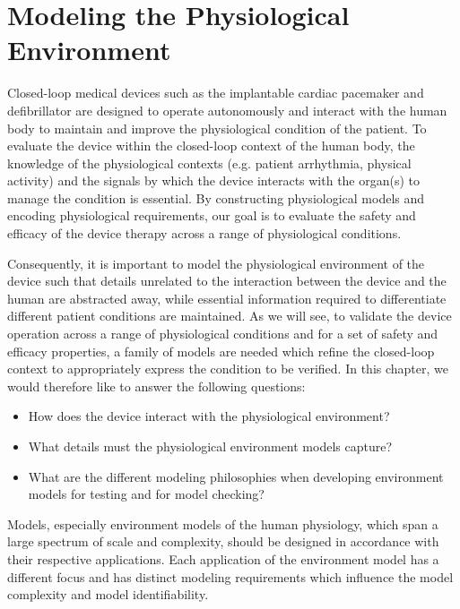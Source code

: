 \chapter{Modeling the Physiological Environment}

Closed-loop medical devices such as the implantable cardiac pacemaker and defibrillator are designed to operate autonomously and interact with the human body to maintain and improve the physiological condition of the patient. To evaluate the device within the closed-loop context of the human body, the knowledge of the physiological contexts (e.g. patient arrhythmia, physical activity) and the signals by which the device interacts with the organ(s) to manage the condition is essential. By constructing physiological models and encoding physiological requirements, our goal is to evaluate the safety and efficacy of the device therapy across a range of physiological conditions. 

Consequently, it is important to model the physiological environment of the device such that details unrelated to the interaction between the device and the human are abstracted away, while essential information required to differentiate different patient conditions are maintained. As we will see, to validate the device operation across a range of physiological conditions and for a set of safety and efficacy properties, a family of models are needed which refine the closed-loop context to appropriately express the condition to be verified. In this chapter, we would therefore like to answer the following questions:
\newpage
\begin{itemize}
\vspace{-5pt}
\item How does the device interact with the physiological environment?
\vspace{-5pt}
\item What details must the physiological environment models capture?
\vspace{-5pt}
\item What are the different modeling philosophies when developing environment models for testing and for model checking?
\end{itemize}

Models, especially environment models of the human physiology, which span a large spectrum of scale and complexity, should be designed in accordance with their respective applications. Each application of the environment model has a different focus and has distinct modeling requirements which influence the model complexity and model identifiability.

